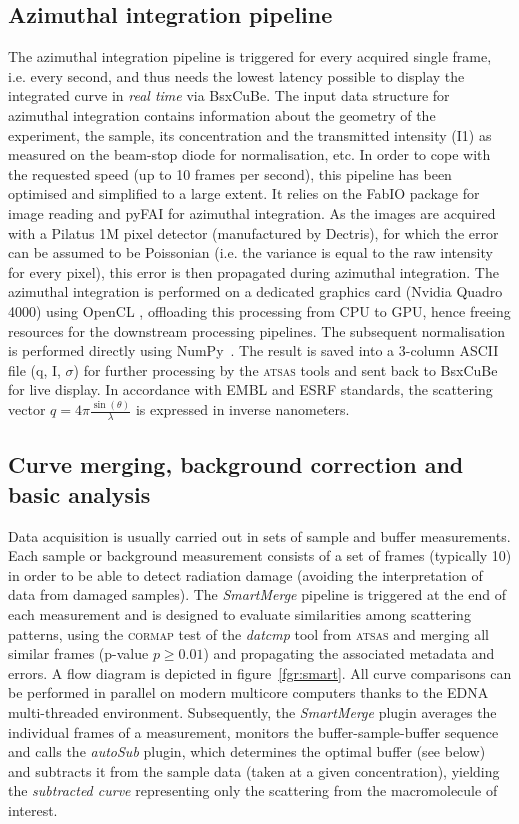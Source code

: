 \documentclass[preprint,pdf]{iucr}              %
\begin{document}
\subsection{Azimuthal integration pipeline}
\label{AI}
The azimuthal integration pipeline is triggered for every acquired single frame,
i.e. every second, and thus needs the lowest latency possible to
display the integrated curve in \textit{real time} via BsxCuBe.
The input data structure for azimuthal integration contains
information about the geometry of the experiment, the sample, its concentration
and the transmitted intensity (I1) as measured on the beam-stop diode for
normalisation, etc.
In order to cope with the requested speed (up to 10 frames per second), this
pipeline has been optimised and simplified to a large extent.
It relies on the FabIO \cite{fabio} package for image reading and pyFAI
\cite{pyFAI} for azimuthal integration.
As the images are acquired with a Pilatus 1M pixel detector (manufactured by
Dectris), for which the error can be assumed to be Poissonian
(i.e. the variance is equal to the raw intensity for every pixel), this error is
then propagated during azimuthal integration.
The azimuthal integration is performed on a dedicated graphics card
(Nvidia Quadro 4000) using OpenCL \cite{pyFAI_gpu}, offloading this processing
from CPU to GPU, hence freeing resources for the downstream processing pipelines.
The subsequent normalisation is performed directly using NumPy~\cite{numpy}.
The result is saved into a 3-column ASCII file (q, I, $\sigma$) for further
processing by the \textsc{atsas} tools \cite{ATSAS2} and sent back to BsxCuBe
for live display.
In accordance with EMBL and ESRF standards, the scattering vector
$q=4\pi\frac{\sin(\theta)}{\lambda}$ is expressed in inverse nanometers.

\subsection{Curve merging, background correction and basic analysis}
\label{SM}
Data acquisition is usually carried out in sets of sample and buffer
measurements.
Each sample or background measurement consists of a set of frames
(typically 10) in order to be able to detect radiation damage
(avoiding the interpretation of data from damaged samples).
The \textit{SmartMerge} pipeline is triggered at the end of each measurement
and is designed to evaluate similarities among scattering
patterns, using the \textsc{cormap} test \cite{CORMAP} of the \textit{datcmp} tool from \textsc{atsas} and merging all
similar frames (p-value $p \geq 0.01$) and  propagating the associated metadata and
errors.
A flow diagram is depicted in figure~\ref{fgr:smart}.
All curve comparisons can be performed in parallel on modern multicore
computers thanks to the EDNA multi-threaded environment.
Subsequently, the \textit{SmartMerge} plugin averages the individual frames
of a measurement, monitors the buffer-sample-buffer sequence and
calls the \textit{autoSub} plugin, which determines the optimal buffer
(see below) and subtracts it from the sample data (taken at a given
concentration), yielding the \textit{subtracted curve} representing only the
scattering from the macromolecule of interest.
\end{document}
